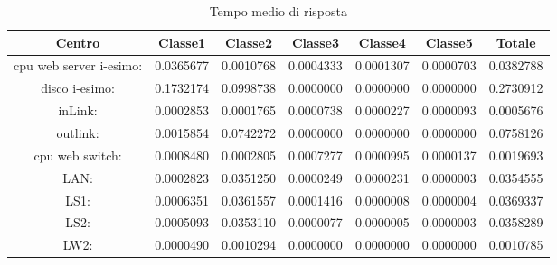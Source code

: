 \begin{table}[H]
\begin{center}\begin{scriptsize}
\begin{tabular}{||c|c|c|c|c|c|c||}
\hline
Centro &Classe1 &Classe2 &Classe3 &Classe4 &Classe5 &Totale\\
\hline
\hline
 cpu web server i-esimo: 	&0.0365677	&0.0010768	&0.0004333	&0.0001307	&0.0000703	&0.0382788\\
\hline
 disco i-esimo: 	&0.1732174	&0.0998738	&0.0000000	&0.0000000	&0.0000000	&0.2730912\\
\hline
 inLink: 	&0.0002853	&0.0001765	&0.0000738	&0.0000227	&0.0000093	&0.0005676\\
\hline
 outlink: 	&0.0015854	&0.0742272	&0.0000000	&0.0000000	&0.0000000	&0.0758126\\
\hline
 cpu web switch: 	&0.0008480	&0.0002805	&0.0007277	&0.0000995	&0.0000137	&0.0019693\\
\hline
 LAN: 	&0.0002823	&0.0351250	&0.0000249	&0.0000231	&0.0000003	&0.0354555\\
\hline
 LS1: 	&0.0006351	&0.0361557	&0.0001416	&0.0000008	&0.0000004	&0.0369337\\
\hline
 LS2: 	&0.0005093	&0.0353110	&0.0000077	&0.0000005	&0.0000003	&0.0358289\\
\hline
 LW2: 	&0.0000490	&0.0010294	&0.0000000	&0.0000000	&0.0000000	&0.0010785\\
\hline
\end{tabular}
\end{scriptsize}\end{center}
\caption{Tempo medio di risposta}
\label{tempomediodirisposta}
\end{table}

